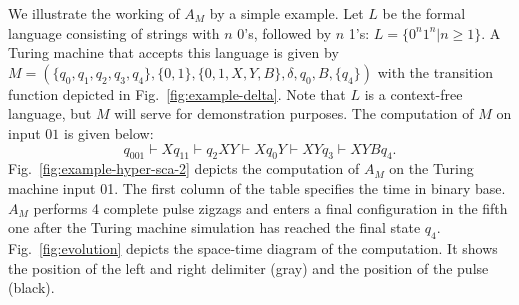 \documentclass[pre,showpacs,showkeys,preprint]{revtex4}
\theoremstyle{definition}
\begin{document}
We illustrate the working of $A_M$ by a simple example.
Let $L$ be the formal language consisting of strings with $n$ 0's, followed by $n$ 1's:
$L = \{0^n1^n | n \geq 1\}$.
A Turing machine that accepts this language is given by
$M = (\{q_0, q_1, q_2, q_3, q_4\}, \{0,1\}, \{0,1,X,Y,B\}, \delta, q_0, B, \{q_4\})$ \cite{hopcroft}
with the transition function depicted in Fig.~\ref{fig:example-delta}.
Note that $L$ is a context-free language, but $M$ will serve for demonstration purposes.
The computation of $M$ on input $01$ is given below:
\[
q_001 \vdash Xq_11  \vdash  q_2XY  \vdash  Xq_0Y  \vdash  XYq_3  \vdash XYBq_4.
\]
Fig.~\ref{fig:example-hyper-sca-2} depicts the computation of $A_M$ on the Turing machine input 01.
The first column of the table specifies the time in binary base.
$A_M$ performs 4 complete pulse zigzags and enters a final configuration in the fifth one after the Turing machine simulation has reached
the final state $q_4$.
Fig.~\ref{fig:evolution} depicts the space-time diagram of the computation.
It shows the position of the left and right delimiter (gray) and the position of the pulse (black).
\end{document}

